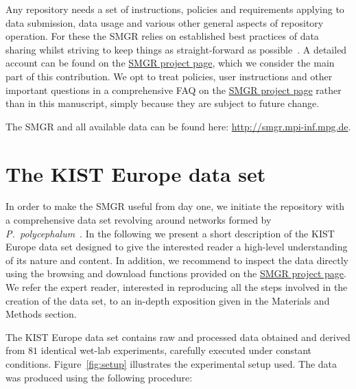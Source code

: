 	Any repository needs a set of instructions, policies and requirements applying to data submission, data usage and various other general aspects of repository operation. For these the SMGR relies on established best practices of data sharing whilst striving to keep things as straight-forward as possible~\cite{white2013nine}. A detailed account can be found on the \href{http://smgr.mpi-inf.mpg.de}{SMGR project page}, which we consider the main part of this contribution. We opt to treat policies, user instructions and other important questions in a comprehensive FAQ on the \href{http://smgr.mpi-inf.mpg.de}{SMGR project page} rather than in this manuscript, simply because they are subject to future change.

	The SMGR and all available data can be found here: \href{http://smgr.mpi-inf.mpg.de}{http://smgr.mpi-inf.mpg.de}.



\section{The KIST Europe data set}	

	In order to make the SMGR useful from day one, we initiate the repository with a comprehensive data set revolving around networks formed by \emph{P.~polycephalum}~\cite{lifecycle}. 
	In the following we present a short description of the KIST Europe data set designed to give the interested reader a high-level understanding of its nature and content. In addition, we recommend to inspect the data directly using the browsing and download functions provided on the \href{http://smgr.mpi-inf.mpg.de}{SMGR project page}. We refer the expert reader, interested in reproducing all the steps involved in the creation of the data set, to an in-depth exposition given in the Materials and Methods section.

	The KIST Europe data set contains raw and processed data obtained and derived from $81$ identical wet-lab experiments, carefully executed under constant conditions. Figure~\ref{fig:setup} illustrates the experimental setup used. The data was produced using the following procedure:

